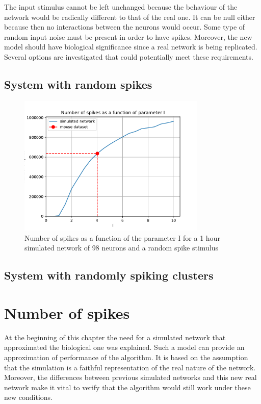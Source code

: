 The input stimulus cannot be left unchanged because the behaviour of the network would be radically different to that of the real one. It can be null either because then no interactions between the neurons would occur. Some type of random input noise must be present in order to have spikes. Moreover, the new model should have biological significance since a real network is being replicated. Several options are investigated that could potentially meet these requirements.\\

\subsection{System with random spikes}

\begin{figure}
	\centering
	\includegraphics[width=0.8\textwidth]{I_var_plot.pdf}
	\caption{Number of spikes as a function of the parameter I for a 1 hour simulated network of 98 neurons and a random spike stimulus}
	\label{fig:I_var_plot}
\end{figure}

\subsection{System with randomly spiking clusters}


\section{Number of spikes}\label{sec:number_of_spikes}

At the beginning of this chapter the need for a simulated network that approximated the biological one was explained. Such a model can provide an approximation of performance of the algorithm. It is based on the assumption that the simulation is a faithful representation of the real nature of the network. Moreover, the differences between previous simulated networks and this new real network make it vital to verify that the algorithm would still work under these new conditions. 

